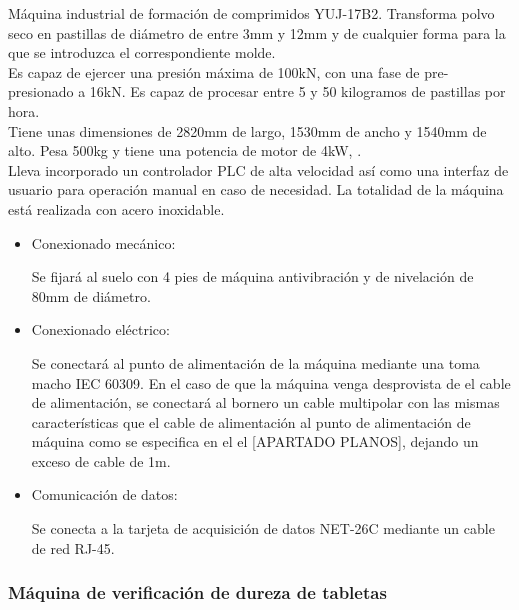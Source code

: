 	Máquina industrial de formación de comprimidos YUJ-17B2. Transforma polvo seco en pastillas de diámetro de entre 3mm y 12mm y de cualquier forma para la que se introduzca el correspondiente molde.\\

	Es capaz de ejercer una presión máxima de 100kN, con una fase de pre-presionado a 16kN. Es capaz de procesar entre 5 y 50 kilogramos de pastillas por hora. \\

	Tiene unas dimensiones de 2820mm de largo, 1530mm de ancho y 1540mm de alto. Pesa 500kg y tiene una potencia de motor de 4kW, .\\

	Lleva incorporado un controlador PLC de alta velocidad así como una interfaz de usuario para operación manual en caso de necesidad. La totalidad de la máquina está realizada con acero inoxidable. 


		\begin{itemize}
				\item{Conexionado mecánico:}
				
				Se fijará al suelo con 4 pies de máquina antivibración y de nivelación de 80mm de diámetro.

				\item{Conexionado eléctrico:}

				Se conectará al punto de alimentación de la máquina mediante una  toma macho IEC 60309. En el caso de que la máquina venga desprovista de el cable de alimentación, se conectará al bornero un cable multipolar con las mismas características que el cable de alimentación al punto de alimentación de máquina como se especifica en el el [APARTADO PLANOS], dejando un exceso de cable de 1m. \
								
				\item{Comunicación de datos:}

				Se conecta a la tarjeta de acquisición de datos NET-26C mediante un cable de red RJ-45.
		\end{itemize}

	\newpage

	\subsubsection{Máquina de verificación de dureza de tabletas}

